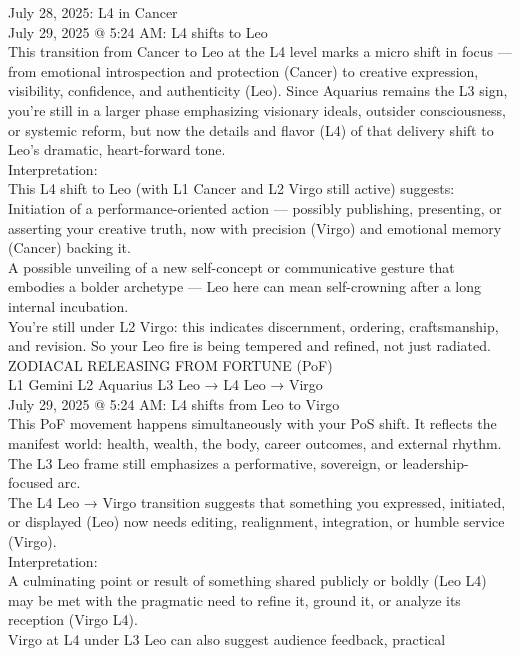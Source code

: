 \documentclass{article}
\begin{document}
July 28, 2025: L4 in Cancer\\
July 29, 2025 @ 5:24 AM: L4 shifts to Leo\\
This transition from Cancer to Leo at the L4 level marks a micro shift
in focus --- from emotional introspection and protection (Cancer) to
creative expression, visibility, confidence, and authenticity (Leo).
Since Aquarius remains the L3 sign, you're still in a larger phase
emphasizing visionary ideals, outsider consciousness, or systemic
reform, but now the details and flavor (L4) of that delivery shift to
Leo's dramatic, heart-forward tone.\\
Interpretation:\\
This L4 shift to Leo (with L1 Cancer and L2 Virgo still active)
suggests:\\
Initiation of a performance-oriented action --- possibly publishing,
presenting, or asserting your creative truth, now with precision (Virgo)
and emotional memory (Cancer) backing it.\\
A possible unveiling of a new self-concept or communicative gesture that
embodies a bolder archetype --- Leo here can mean self-crowning after a
long internal incubation.\\
You're still under L2 Virgo: this indicates discernment, ordering,
craftsmanship, and revision. So your Leo fire is being tempered and
refined, not just radiated.\\
 ZODIACAL RELEASING FROM FORTUNE (PoF)\\
L1 Gemini \textbar{} L2 Aquarius \textbar{} L3 Leo → L4 Leo → Virgo\\
July 29, 2025 @ 5:24 AM: L4 shifts from Leo to Virgo\\
This PoF movement happens simultaneously with your PoS shift. It
reflects the manifest world: health, wealth, the body, career outcomes,
and external rhythm.\\
The L3 Leo frame still emphasizes a performative, sovereign, or
leadership-focused arc.\\
The L4 Leo → Virgo transition suggests that something you expressed,
initiated, or displayed (Leo) now needs editing, realignment,
integration, or humble service (Virgo).\\
Interpretation:\\
A culminating point or result of something shared publicly or boldly
(Leo L4) may be met with the pragmatic need to refine it, ground it, or
analyze its reception (Virgo L4).\\
Virgo at L4 under L3 Leo can also suggest audience feedback, practical
\end{document}

